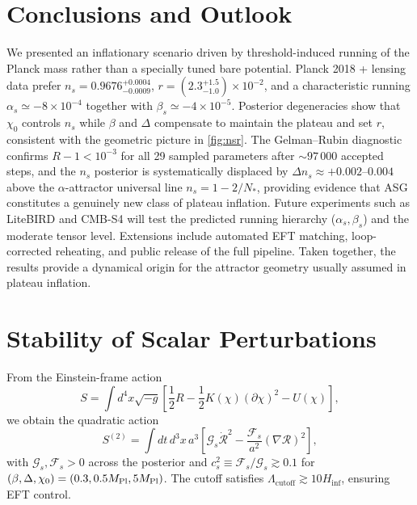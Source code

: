 \documentclass[11pt,a4paper]{article}
\begin{document}
\section{Conclusions and Outlook}
We presented an inflationary scenario driven by threshold-induced running of the Planck mass rather than a specially tuned bare potential. Planck 2018 + lensing data prefer $n_{s}=0.9676^{+0.0004}_{-0.0009}$, $r=(2.3^{+1.5}_{-1.0})\times10^{-2}$, and a characteristic running $\alpha_{s}\simeq-8\times10^{-4}$ together with $\beta_{s}\simeq-4\times10^{-5}$. Posterior degeneracies show that $\chi_{0}$ controls $n_{s}$ while $\beta$ and $\Delta$ compensate to maintain the plateau and set $r$, consistent with the geometric picture in \cref{fig:nsr}. The Gelman--Rubin diagnostic confirms $R-1<10^{-3}$ for all 29 sampled parameters after ${\sim}97\,000$ accepted steps, and the $n_s$ posterior is systematically displaced by $\Delta n_s\approx+0.002$--$0.004$ above the $\alpha$-attractor universal line $n_s=1-2/N_*$, providing evidence that ASG constitutes a genuinely new class of plateau inflation. Future experiments such as LiteBIRD and CMB-S4 will test the predicted running hierarchy ($\alpha_{s},\beta_{s}$) and the moderate tensor level. Extensions include automated EFT matching, loop-corrected reheating, and public release of the full pipeline. Taken together, the results provide a dynamical origin for the attractor geometry usually assumed in plateau inflation.

\section{Stability of Scalar Perturbations}
\label{sec:stability}
From the Einstein-frame action
\begin{equation}
S=\int d^{4}x\sqrt{-g}\left[\frac{1}{2}R-\frac{1}{2}K(\chi)(\partial\chi)^{2}-U(\chi)\right],
\end{equation}
we obtain the quadratic action
\begin{equation}
S^{(2)}=\int dt\,d^{3}x\,a^{3}\left[\mathcal{G}_{s}\dot{\mathcal{R}}^{2}-\frac{\mathcal{F}_{s}}{a^{2}}(\nabla\mathcal{R})^{2}\right],
\end{equation}
with $\mathcal{G}_{s},\mathcal{F}_{s}>0$ across the posterior and $c_{s}^{2}\equiv\mathcal{F}_{s}/\mathcal{G}_{s}\gtrsim0.1$ for $(\beta,\Delta,\chi_{0})=(0.3,0.5M_{\rm Pl},5M_{\rm Pl})$. The cutoff satisfies $\Lambda_{\text{cutoff}}\gtrsim10H_{\text{inf}}$, ensuring EFT control.
\end{document}
